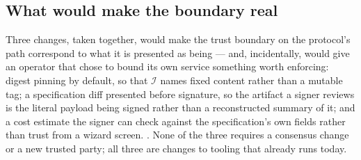 \subsection{What would make the boundary real}

Three changes, taken together, would make the trust boundary on the protocol's path
correspond to what it is presented as being — and, incidentally, would give an operator
that chose to bound its own service something worth enforcing: digest pinning by default,
so that \(\mathcal{I}\)
names fixed content rather than a mutable tag; a specification diff presented before
signature, so the artifact a signer reviews is the literal payload being signed rather
than a reconstructed summary of it; and a cost estimate the signer can check against the
specification's own fields rather than trust from a wizard screen. \planned \srcinferred.
None of the three requires a consensus change or a new trusted party; all three are
changes to tooling that already runs today.

\FloatBarrier
